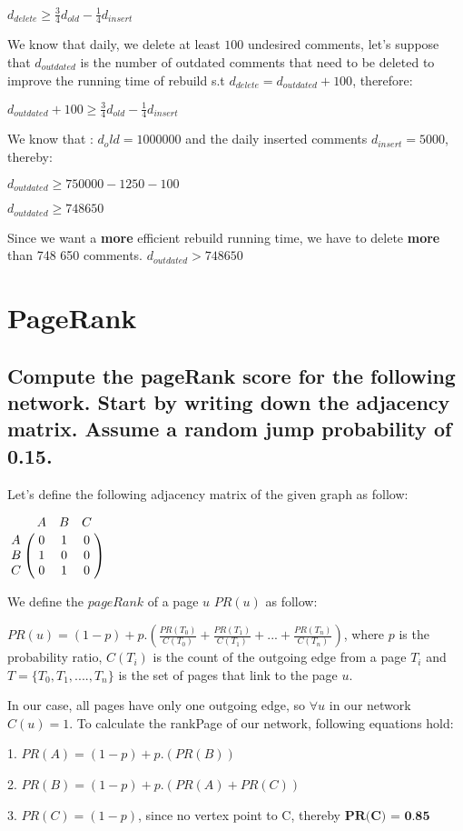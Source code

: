 \documentclass{scrartcl}
\begin{document}
$d_{delete} \geq  \frac{3}{4} d_{old}  - \frac{1}{4}  d_{insert} $

We know that daily, we delete at least $100$ undesired comments, let's suppose that $d_{outdated}$ is the number of outdated comments that need to be deleted to improve the running time of rebuild s.t $d_{delete}= d_{outdated} + 100$, therefore:

$d_{outdated} + 100 \geq \frac{3}{4} d_{old}  - \frac{1}{4}  d_{insert} $

We know that : $d_old = 1 000 000$ and the daily inserted comments $d_{insert} = 5000$, thereby:

$d_{outdated} \geq 750 000 - 1 250 - 100$

$d_{outdated} \geq 748 650$

Since we want a \textbf{more} efficient rebuild running time, we have to delete \textbf{more} than 748 650 comments. $d_{outdated} > 748 650$
  

\section{PageRank}

\subsection{Compute the pageRank score for the following network. Start by writing down the adjacency
matrix. Assume a random jump probability of 0.15.}

Let's define the following adjacency matrix of the given graph as follow:

 $
\bordermatrix{
  & A	& B   & C   \cr
A &0& 1 & 0 \cr
B & 1 & 0 &0 \cr
C & 0 & 1 & 0 \cr
}
$  

We define the $pageRank$ of a page $u$ $PR(u)$ as follow:

$PR(u) = (1- p) + p.( \frac{PR(T_0)}{C(T_0)} + \frac{PR(T_1)}{C(T_1)}+ ... + \frac{PR(T_n)}{C(T_n)})$, where $p$ is the probability ratio, $C(T_i)$ is the count of the outgoing edge from a page $T_i$ and $T = \{T_0 , T_1 , .... , T_n\}$ is the set of pages that link to the page $u$.

In our case, all pages have only one outgoing edge, so $\forall u $ in our network $C(u) = 1$. To calculate the rankPage of our network, following equations hold:

1. $PR(A) = (1 - p) + p.( PR(B))$

2. $PR(B) = (1 - p) + p.( PR(A) + PR(C))$

3. $PR(C) = (1 - p)$, since no vertex point to C, thereby $\textbf{PR(C) = 0.85}$
\end{document}
